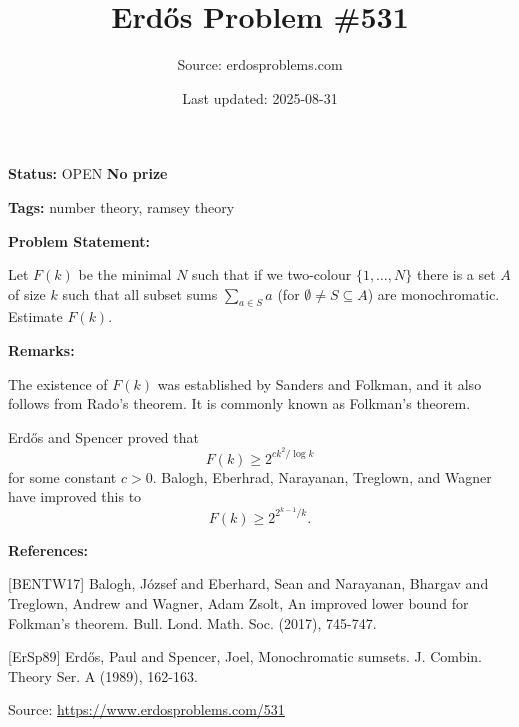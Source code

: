 \documentclass{article}
\title{Erd\H{o}s Problem \#531}
\date{Last updated: 2025-08-31}
\author{Source: erdosproblems.com}
\begin{document}
\maketitle

\noindent\textbf{Status:} OPEN \quad \textbf{No prize}

\noindent\textbf{Tags:} number theory, ramsey theory

\medskip
\noindent\textbf{Problem Statement:}

Let $F(k)$ be the minimal $N$ such that if we two-colour $\{1,\ldots,N\}$ there is a set $A$ of size $k$ such that all subset sums $\sum_{a\in S}a$ (for $\emptyset\neq S\subseteq A$) are monochromatic. Estimate $F(k)$.

\bigskip
\noindent\textbf{Remarks:}

The existence of $F(k)$ was established by Sanders and Folkman, and it also follows from Rado's theorem. It is commonly known as Folkman's theorem.

Erd\H{o}s and Spencer \cite{ErSp89} proved that\[F(k) \geq 2^{ck^2/\log k}\]for some constant $c>0$. Balogh, Eberhrad, Narayanan, Treglown, and Wagner \cite{BENTW17} have improved this to\[F(k) \geq 2^{2^{k-1}/k}.\]

\bigskip
\noindent\textbf{References:}

[BENTW17] Balogh, J\'{o}zsef and Eberhard, Sean and Narayanan, Bhargav and Treglown, Andrew and Wagner, Adam Zsolt, An improved lower bound for Folkman's theorem. Bull. Lond. Math. Soc. (2017), 745-747.
 
 [ErSp89] Erd\H{o}s, Paul and Spencer, Joel, Monochromatic sumsets. J. Combin. Theory Ser. A (1989), 162-163.

\bigskip
\noindent\small{Source: \url{https://www.erdosproblems.com/531}}
\end{document}
